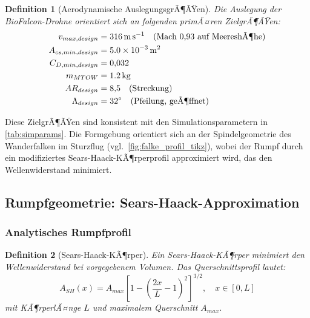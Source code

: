 ﻿\documentclass[12pt,a4paper]{article}
\newtheorem{definition}{Definition}[section]
\theoremstyle{remark}
\begin{document}
	\begin{definition}[Aerodynamische AuslegungsgrÃ¶ÃŸen]
		\label{def:auslegung}
		Die Auslegung der BioFalcon-Drohne orientiert sich an folgenden primÃ¤ren
		ZielgrÃ¶ÃŸen:
		\begin{align}
			v_{max,design}     &= \SI{316}{\m\per\second} \quad\text{(Mach 0{,}93 auf MeereshÃ¶he)} \\
			A_{cs,min,design}  &= \SI{5{,}0e-3}{\m^2}                                               \\
			C_{D,min,design}   &= 0{,}032                                                            \\
			m_{MTOW}           &= \SI{1{,}2}{\kg}                                                    \\
			AR_{design}        &= 8{,}5 \quad\text{(Streckung)}                                      \\
			\Lambda_{design}   &= 32^{\circ} \quad\text{(Pfeilung, geÃ¶ffnet)}
		\end{align}
	\end{definition}
	
	Diese ZielgrÃ¶ÃŸen sind konsistent mit den Simulationsparametern in
	\cref{tab:simparams}.  Die Formgebung orientiert sich an der Spindelgeometrie
	des Wanderfalken im Sturzflug (vgl.\ \cref{fig:falke_profil_tikz}), wobei der
	Rumpf durch ein modifiziertes Sears-Haack-KÃ¶rperprofil approximiert wird, das
	den Wellenwiderstand minimiert.
	
	\subsection{Rumpfgeometrie: Sears-Haack-Approximation}
	\label{sec:rumpf}
	
	\subsubsection{Analytisches Rumpfprofil}
	
	\begin{definition}[Sears-Haack-KÃ¶rper]
		\label{def:searhaack}
		Ein Sears-Haack-KÃ¶rper minimiert den Wellenwiderstand bei vorgegebenem Volumen.
		Das Querschnittsprofil lautet:
		\begin{equation}
			A_{SH}(x) = A_{max}\left[1 - \left(\frac{2x}{L} - 1\right)^2\right]^{3/2},
			\quad x \in [0, L]
			\label{eq:sears_haack}
		\end{equation}
		mit KÃ¶rperlÃ¤nge $L$ und maximalem Querschnitt $A_{max}$.
	\end{definition}
	
\end{document}
